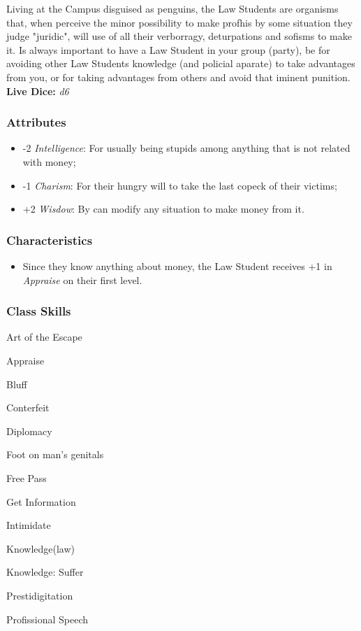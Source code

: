 \documentclass[ letterpaper,12pt]{article}
\begin{document}
Living at the Campus disguised as penguins, the Law Students are organisms
that, when perceive the minor possibility to make profhis by some situation
they judge "juridic", will use of all their verborragy, deturpations and
sofisms to make it. Is always important to have a Law Student in your group
(party), be for avoiding other Law Students knowledge (and policial aparate) to
take advantages from you, or for taking advantages from others and avoid that
iminent punition.\\

{\bf Live Dice:} {\it d6}

\subsubsection{Attributes}
\begin{itemize}
\item{-2 {\it Intelligence}: For usually being stupids among anything that is not related with money;}
\item{-1 {\it Charism}: For their hungry will to take the last copeck of their victims;}
\item{+2 {\it Wisdow}: By can modify any situation to make money from it.}
\end{itemize}

\subsubsection{Characteristics}

\begin{itemize}
\item{Since they know anything about money, the Law Student receives +1 in {\it Appraise} on their first level.}
\end{itemize}

\subsubsection{Class Skills}
\begin{itemize}
{\it
\item{Art of the Escape}
\item{Appraise}
\item{Bluff}
\item{Conterfeit}
\item{Diplomacy}
\item{Foot on man's genitals}
\item{Free Pass}
\item{Get Information}
\item{Intimidate}
\item{Knowledge(law)}
\item{Knowledge: Suffer}
\item{Prestidigitation}
\item{Profissional Speech}
}
\end{itemize}
\end{document}
